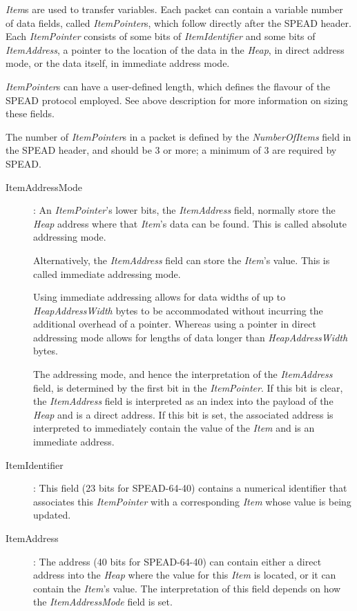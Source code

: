 \documentclass[11pt,english,twoside]{article}
\begin{document}
\emph{Item}s are used to transfer variables. Each packet can contain a variable number of data fields, called \emph{ItemPointer}s, which follow
directly after the SPEAD header. Each \emph{ItemPointer} consists of some bits of \emph{ItemIdentifier} and some bits of \emph{ItemAddress}, a
pointer to the location of the data in the \emph{Heap}, in direct address mode, or the data itself, in immediate address mode.

\emph{ItemPointer}s can have a user-defined length, which defines the flavour of the SPEAD protocol employed. See above description for more
information on sizing these fields.

The number of \emph{ItemPointer}s in a packet is defined by the \emph{NumberOfItems} field in the SPEAD header, and should be 3 or more; a
minimum of 3 are required by SPEAD.

\begin{description}

\item[ItemAddressMode]: An \emph{ItemPointer}'s lower bits, the \emph{ItemAddress} field, normally store the \emph{Heap} address where that
\emph{Item}'s data can be found. This is called absolute addressing mode.

Alternatively, the \emph{ItemAddress} field can store the \emph{Item}'s value. This is called immediate addressing mode.

Using immediate addressing allows for data widths of up to \emph{HeapAddressWidth} bytes to be accommodated without incurring the additional
overhead of a pointer. Whereas using a pointer in direct addressing mode allows for lengths of data longer than \emph{HeapAddressWidth} bytes.

The addressing mode, and hence the interpretation of the \emph{ItemAddress} field, is determined by the first bit in the \emph{ItemPointer}. If
this bit is clear, the \emph{ItemAddress} field is interpreted as an index into the payload of the \emph{Heap} and is a direct address.  If this
bit is set, the associated address is interpreted to immediately contain the value of the \emph{Item} and is an immediate address.

\item[ItemIdentifier]: This field (23 bits for SPEAD-64-40) contains a numerical identifier that associates this \emph{ItemPointer} with a
corresponding \emph{Item} whose value is being updated.

\item[ItemAddress]: The address (40 bits for SPEAD-64-40) can contain either a direct address into the \emph{Heap} where the value for this
\emph{Item} is located, or it can contain the \emph{Item}'s value.  The interpretation of this field depends on how the \emph{ItemAddressMode}
field is set.

\end{description}
\end{document}
